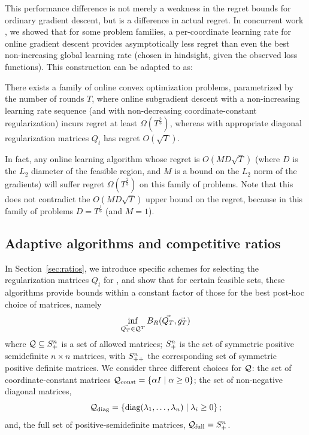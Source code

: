 This performance difference is not merely a weakness in the regret
bounds for ordinary gradient descent, but is a difference in actual
regret.  In concurrent work \cite{streeter10percoord}, we showed that
for some problem families, a per-coordinate learning rate for online
gradient descent provides asymptotically less regret than even the
best non-increasing global learning rate (chosen in hindsight, given
the observed loss functions).  This construction can be adapted to \FTPRL as:
\begin{theorem} \label {thm:bad_class}
There exists a family of online convex optimization problems,
parametrized by the number of rounds $T$, where online subgradient
descent with a non-increasing learning rate sequence (and \FTPRL with
non-decreasing coordinate-constant regularization) incurs regret at
least $\Omega(T^\frac{2}{3})$, whereas \FTPRL with appropriate
diagonal regularization matrices $Q_t$ has regret $O(\sqrt{T})$.
\end{theorem}
In fact, any online learning algorithm whose regret is
$O(M D \sqrt T)$ (where $D$ is the $L_2$ diameter of the
feasible region, and $M$ is a bound on the $L_2$ norm of the
gradients) will suffer regret $\Omega(T^\frac{2}{3})$ on this family
of problems.
Note that this does not contradict the $O(M D \sqrt T)$ upper bound on
the regret, because in this family of problems $D = T^{\frac 1 6}$
(and $M = 1$).




\subsection{Adaptive algorithms and competitive ratios}

In Section~\ref{sec:ratios}, we introduce specific schemes for
selecting the regularization matrices $Q_t$ for \FTPRL, and show that
for certain feasible sets, these algorithms provide bounds within a
constant factor of those for the best post-hoc choice of matrices,
namely
\begin{equation} \label{eq:posthocbound}
  \inf_{\vec{Q_T} \in \mathcal{Q}^T} B_R(\vec{Q_T}, \vec{g_T})
\end{equation}
where $\mathcal{Q} \subseteq S^n_{+}$ is a set of allowed matrices; $S^n_{+}$ is
the set of symmetric positive semidefinite $n \times n$ matrices, with
$S^n_{++}$ the corresponding set of symmetric positive definite matrices.
We consider three different choices for $\mathcal{Q}$: the set of
coordinate-constant matrices $\mathcal{Q}_{\text{const}} = \left\{\alpha I \mid \alpha \geq
0\right\}$; the set of non-negative diagonal matrices,
\[\mathcal{Q}_{\text{diag}} = \left\{\text{diag}(\lambda_1, \dots, \lambda_n) \mid \lambda_i \geq 0\right\};\]
and, the full set of positive-semidefinite matrices, $\mathcal{Q}_{\text{full}} =S^n_{+}$.


